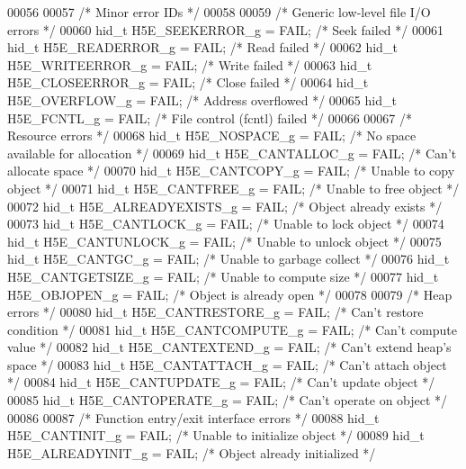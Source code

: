 \begin{DoxyCode}
00056 
00057 \textcolor{comment}{/* Minor error IDs */}
00058 
00059 \textcolor{comment}{/* Generic low-level file I/O errors */}
00060 hid\_t H5E\_SEEKERROR\_g      = FAIL;      \textcolor{comment}{/* Seek failed */}
00061 hid\_t H5E\_READERROR\_g      = FAIL;      \textcolor{comment}{/* Read failed */}
00062 hid\_t H5E\_WRITEERROR\_g     = FAIL;      \textcolor{comment}{/* Write failed */}
00063 hid\_t H5E\_CLOSEERROR\_g     = FAIL;      \textcolor{comment}{/* Close failed */}
00064 hid\_t H5E\_OVERFLOW\_g       = FAIL;      \textcolor{comment}{/* Address overflowed */}
00065 hid\_t H5E\_FCNTL\_g          = FAIL;      \textcolor{comment}{/* File control (fcntl) failed */}
00066 
00067 \textcolor{comment}{/* Resource errors */}
00068 hid\_t H5E\_NOSPACE\_g        = FAIL;      \textcolor{comment}{/* No space available for allocation */}
00069 hid\_t H5E\_CANTALLOC\_g      = FAIL;      \textcolor{comment}{/* Can't allocate space */}
00070 hid\_t H5E\_CANTCOPY\_g       = FAIL;      \textcolor{comment}{/* Unable to copy object */}
00071 hid\_t H5E\_CANTFREE\_g       = FAIL;      \textcolor{comment}{/* Unable to free object */}
00072 hid\_t H5E\_ALREADYEXISTS\_g  = FAIL;      \textcolor{comment}{/* Object already exists */}
00073 hid\_t H5E\_CANTLOCK\_g       = FAIL;      \textcolor{comment}{/* Unable to lock object */}
00074 hid\_t H5E\_CANTUNLOCK\_g     = FAIL;      \textcolor{comment}{/* Unable to unlock object */}
00075 hid\_t H5E\_CANTGC\_g         = FAIL;      \textcolor{comment}{/* Unable to garbage collect */}
00076 hid\_t H5E\_CANTGETSIZE\_g    = FAIL;      \textcolor{comment}{/* Unable to compute size */}
00077 hid\_t H5E\_OBJOPEN\_g        = FAIL;      \textcolor{comment}{/* Object is already open */}
00078 
00079 \textcolor{comment}{/* Heap errors */}
00080 hid\_t H5E\_CANTRESTORE\_g    = FAIL;      \textcolor{comment}{/* Can't restore condition */}
00081 hid\_t H5E\_CANTCOMPUTE\_g    = FAIL;      \textcolor{comment}{/* Can't compute value */}
00082 hid\_t H5E\_CANTEXTEND\_g     = FAIL;      \textcolor{comment}{/* Can't extend heap's space */}
00083 hid\_t H5E\_CANTATTACH\_g     = FAIL;      \textcolor{comment}{/* Can't attach object */}
00084 hid\_t H5E\_CANTUPDATE\_g     = FAIL;      \textcolor{comment}{/* Can't update object */}
00085 hid\_t H5E\_CANTOPERATE\_g    = FAIL;      \textcolor{comment}{/* Can't operate on object */}
00086 
00087 \textcolor{comment}{/* Function entry/exit interface errors */}
00088 hid\_t H5E\_CANTINIT\_g       = FAIL;      \textcolor{comment}{/* Unable to initialize object */}
00089 hid\_t H5E\_ALREADYINIT\_g    = FAIL;      \textcolor{comment}{/* Object already initialized */}

\end{DoxyCode}
